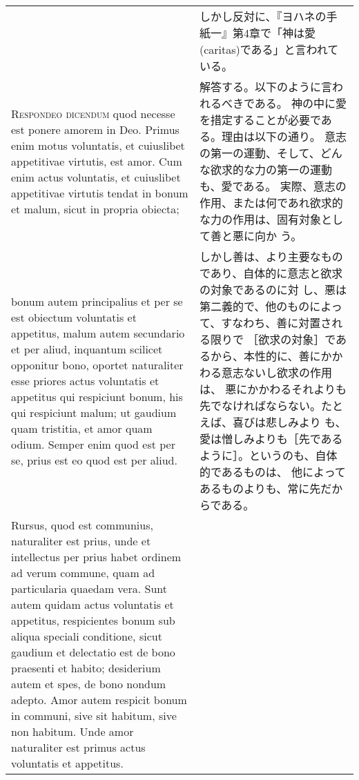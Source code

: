 \documentclass[10pt]{jsarticle} %
\begin{document}
\begin{longtable}{p{21em}p{21em}}
&

しかし反対に、『ヨハネの手紙一』第4章で「神は愛(caritas)である」と言われている。


\\


{\scshape Respondeo dicendum} quod necesse est ponere
amorem in Deo. Primus enim motus voluntatis, et cuiuslibet appetitivae
virtutis, est amor. Cum enim actus voluntatis, et cuiuslibet appetitivae
virtutis tendat in bonum et malum, sicut in propria obiecta; 



&

解答する。以下のように言われるべきである。
神の中に愛を措定することが必要である。理由は以下の通り。
意志の第一の運動、そして、どんな欲求的な力の第一の運動も、愛である。
実際、意志の作用、または何であれ欲求的な力の作用は、固有対象として善と悪に向か
 う。

\\

bonum autem
principalius et per se est obiectum voluntatis et appetitus, malum autem
secundario et per aliud, inquantum scilicet opponitur bono, oportet
naturaliter esse priores actus voluntatis et appetitus qui respiciunt
bonum, his qui respiciunt malum; ut gaudium quam tristitia, et amor quam
odium. Semper enim quod est per se, prius est eo quod est per
aliud. 

&

しかし善は、より主要なものであり、自体的に意志と欲求の対象であるのに対
 し、悪は第二義的で、他のものによって、すなわち、善に対置される限りで
 ［欲求の対象］であるから、本性的に、善にかかわる意志ないし欲求の作用は、
 悪にかかわるそれよりも先でなければならない。たとえば、喜びは悲しみより
 も、愛は憎しみよりも［先であるように］。というのも、自体的であるものは、
 他によってあるものよりも、常に先だからである。


\\



Rursus, quod est communius, naturaliter est prius, unde et
intellectus per prius habet ordinem ad verum commune, quam ad
particularia quaedam vera. Sunt autem quidam actus voluntatis et
appetitus, respicientes bonum sub aliqua speciali conditione, sicut
gaudium et delectatio est de bono praesenti et habito; desiderium autem
et spes, de bono nondum adepto. Amor autem respicit bonum in communi,
sive sit habitum, sive non habitum. Unde amor naturaliter est primus
actus voluntatis et appetitus. 




\end{longtable}
\end{document}
